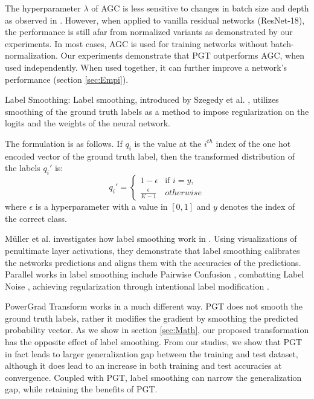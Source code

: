\documentclass[times,sort&compress]{elsarticle}
\begin{document}
The hyperparameter $\lambda$ of AGC is less sensitive to changes in batch size and depth
as observed in \cite{brock2021high}. However, when applied to vanilla residual networks
(ResNet-18), the performance is still afar from normalized variants as demonstrated by
our experiments. In most cases, AGC is used for training networks without
batch-normalization. Our experiments demonstrate that PGT outperforms AGC, when used
independently. When used together, it can further improve a network's performance
(section \ref{sec:Empi}).








Label Smoothing: Label smoothing, introduced by Szegedy et al.
\cite{szegedy2016rethinking}, utilizes smoothing of the ground truth labels as a method
to impose regularization on the logits and the weights of the neural network.



The formulation is as follows. If $q_i$ is the value at the $i^{th}$ index of the one
hot encoded vector of the ground truth label, then the transformed distribution of the
labels $q_i'$ is: \begin{equation} q_i' = \begin{cases} 1-\epsilon & \text{if } i = y,
\\ \frac{\epsilon}{K-1} & otherwise \end{cases} \end{equation} where $\epsilon$ is a
hyperparameter with a value in $[0,1]$ and $y$ denotes the index of the correct class.



Müller et al. investigates how label smoothing work in \cite{DBLP:conf/nips/MullerKH19}.
Using visualizations of penultimate layer activations, they demonstrate that label
smoothing calibrates the networks predictions and aligns them with the accuracies of the
predictions. Parallel works in label smoothing include Pairwise Confusion
\cite{dubey2018pairwise}, combatting Label Noise \cite{reed2014training}, achieving
regularization through intentional label modification \cite{xie2016disturblabel}.

PowerGrad Transform works in a much different way. PGT does not smooth the ground truth
labels, rather it modifies the gradient by smoothing the predicted probability vector.
As we show in section \ref{sec:Math}, our proposed transformation has the opposite
effect of label smoothing. From our studies, we show that PGT in fact leads to larger
generalization gap between the training and test dataset, although it does lead to an
increase in both training and test accuracies at convergence. Coupled with PGT, label
smoothing can narrow the generalization gap, while retaining the benefits of PGT.
\end{document}
